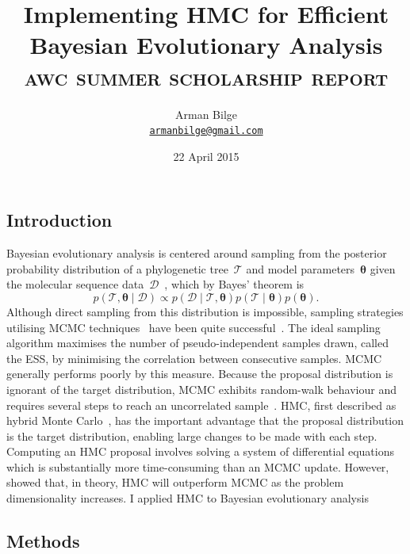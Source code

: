 \documentclass{article}
\title{Implementing \acl{HMC} for Efficient Bayesian Evolutionary Analysis \\
           \Large\textsc{awc summer scholarship report}}
\author{Arman Bilge \\ \texttt{\href{mailto:armanbilge@gmail.com}{armanbilge@gmail.com}}}
\date{22 April 2015}
\renewcommand{\vec}[1]{\ensuremath{\boldsymbol{\mathbf{#1}}}}
\begin{document}
    \maketitle

    \subsection*{Introduction}

    Bayesian evolutionary analysis is centered around sampling from the
        posterior probability distribution of a phylogenetic
        tree~$\mathcal{T}$ and model parameters~$\vec\theta$
        given the molecular sequence data~$\mathcal{D}$~\cite{Bou+14},
        which by Bayes' theorem is
        \begin{equation}
            p\left(\mathcal{T}, \vec\theta \mid \mathcal{D}\right)
                \propto p\left(\mathcal{D} \mid \mathcal{T},\vec\theta\right)
                p\left(\mathcal{T} \mid \vec\theta\right) p\left(\vec\theta\right).
        \end{equation}
    Although direct sampling from this distribution is impossible, sampling
        strategies utilising \ac{MCMC} techniques~\cite{Met+53} have been quite
        successful~\cite{Ron+12,Dru+12,Bou+14}.
    The ideal sampling algorithm maximises the number of pseudo-independent
        samples drawn, called the \ac{ESS}, by minimising the correlation
        between consecutive samples.
    \ac{MCMC} generally performs poorly by this measure.
    Because the proposal distribution is ignorant of the target distribution,
        \ac{MCMC} exhibits random-walk behaviour and requires several steps to
        reach an uncorrelated sample~\cite{Nea11}.
    \ac{HMC}, first described as hybrid Monte Carlo~\cite{Dua+87},
        has the important advantage that the proposal distribution is the
        target distribution, enabling large changes to be made with each step.
    Computing an \ac{HMC} proposal involves solving a system of differential
        equations which is substantially more time-consuming than an \ac{MCMC}
        update.
    However, \textcite{Nea11} showed that, in theory, \ac{HMC} will outperform
        \ac{MCMC} as the problem dimensionality increases.
    I applied \ac{HMC} to Bayesian evolutionary analysis

    \subsection*{Methods}
\end{document}
